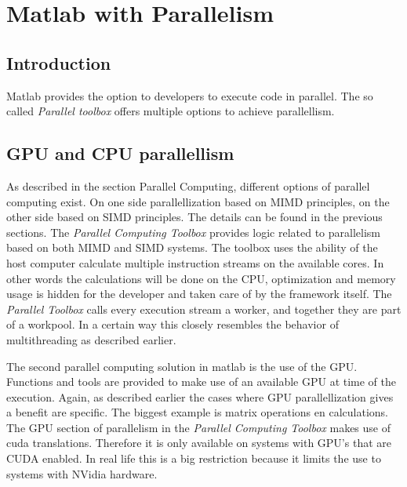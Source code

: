 \section{Matlab with Parallelism}
\subsection{Introduction}
Matlab provides the option to developers to execute code in parallel.
The so called \textit{Parallel toolbox} offers multiple options to achieve parallellism. \cite{Parallel63:online}
\subsection{GPU and CPU parallellism}
As described in the section Parallel Computing, different options of parallel computing exist.
On one side parallellization based on MIMD principles, on the other side based on SIMD principles.
The details can be found in the previous sections.
The \textit{Parallel Computing Toolbox} provides logic related to parallelism based on both MIMD and SIMD systems.
The toolbox uses the ability of the host computer calculate multiple instruction streams on the available cores.
In other words the calculations will be done on the CPU, optimization and memory usage is hidden for the developer and taken care of by the framework itself.
The \textit{Parallel Toolbox} calls every execution stream a worker, and together they are part of a workpool.
In a certain way this closely resembles the behavior of multithreading as described earlier.
\par 
The second parallel computing solution in matlab is the use of the GPU.\cite{MATLABGP8:online}
Functions and tools are provided to make use of an available GPU at time of the execution.
Again, as described earlier the cases where GPU parallellization gives a benefit are specific. 
The biggest example is matrix operations en calculations.
The GPU section of parallelism in the \textit{Parallel Computing Toolbox} makes use of cuda translations.
Therefore it is only available on systems with GPU's that are CUDA enabled.
In real life this is a big restriction because it limits the use to systems with NVidia hardware.

